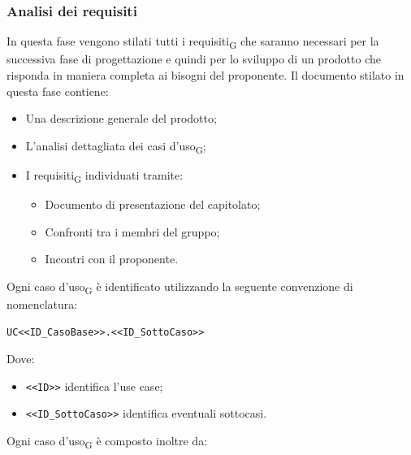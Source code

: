     \subsubsection{Analisi dei requisiti}
    In questa fase vengono stilati tutti i requisiti\textsubscript{G} che saranno necessari per la successiva fase di progettazione e quindi per lo sviluppo di un prodotto che risponda in maniera completa ai bisogni del proponente.
    Il documento stilato in questa fase contiene:
    \begin{itemize}
    	\item Una descrizione generale del prodotto;
    	\item L'analisi dettagliata dei casi d'uso\textsubscript{G};
    	\item I requisiti\textsubscript{G} individuati tramite:
        \begin{itemize}
            \item Documento di presentazione del capitolato;
            \item Confronti tra i membri del gruppo;
            \item Incontri con il proponente.
        \end{itemize}
    \end{itemize} 
    Ogni caso d'uso\textsubscript{G} è identificato utilizzando la seguente convenzione di nomenclatura:
    \begin{center}
		\verb|UC<<ID_CasoBase>>.<<ID_SottoCaso>>|
    \end{center}
    Dove:
    \begin{itemize}
    	\item \verb|<<ID>>| identifica l'use case;
    	\item \verb|<<ID_SottoCaso>>| identifica eventuali sottocasi.
    \end{itemize}
	Ogni caso d'uso\textsubscript{G} è composto inoltre da:

